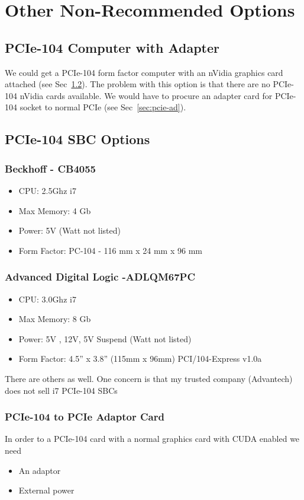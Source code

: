 \documentclass{article}
\begin{document}
\section{Other Non-Recommended Options}
\subsection{PCIe-104 Computer with Adapter}
We could get a PCIe-104 form factor computer with an nVidia graphics card attached (see Sec~\ref{sec:pcie-op}).  
The problem with this option is that there are no PCIe-104 nVidia cards available.
We would have to procure an adapter card for PCIe-104 socket to normal PCIe (see Sec~\ref{sec:pcie-ad}).

\subsection{PCIe-104 SBC Options}\label{sec:pcie-op}
\subsubsection{Beckhoff - CB4055}
\begin{itemize}
\item CPU: 2.5Ghz i7
\item Max Memory: 4 Gb
\item Power: 5V (Watt not listed)
\item Form Factor: PC-104 - 116 mm x 24 mm x 96 mm
\end{itemize}

\subsubsection{Advanced Digital Logic -ADLQM67PC}
\begin{itemize}
\item CPU: 3.0Ghz i7
\item Max Memory: 8 Gb
\item Power: 5V , 12V, 5V Suspend (Watt not listed)
\item Form Factor: 4.5” x 3.8” (115mm x 96mm) PCI/104-Express v1.0a
\end{itemize}

There are others as well.  One concern is that my trusted company (Advantech) does not sell i7 PCIe-104 SBCs

\subsubsection{PCIe-104 to PCIe Adaptor Card}
In order to a PCIe-104 card with a normal graphics card with CUDA enabled we need 
\begin{itemize}
\item An adaptor
\item External power
\end{itemize}
\end{document}
